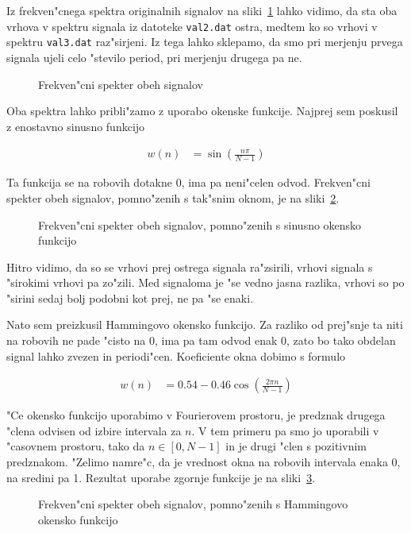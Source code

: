 \documentclass[a4paper,10pt]{article}
\begin{document}
Iz frekven"cnega spektra originalnih signalov na sliki~\ref{fig:val-fft} lahko vidimo, da sta oba vrhova v spektru signala iz datoteke \texttt{val2.dat} ostra, medtem ko so vrhovi v spektru \texttt{val3.dat} raz"sirjeni. Iz tega lahko sklepamo, da smo pri merjenju prvega signala ujeli celo "stevilo period, pri merjenju drugega pa ne. 

\begin{figure}[h]
 
\caption{Frekven"cni spekter obeh signalov}
\label{fig:val-fft}
\end{figure}

Oba spektra lahko pribli"zamo z uporabo okenske funkcije. Najprej sem poskusil z enostavno sinusno funkcijo

\begin{align}
 w(n) &= \sin(\frac{n\pi}{N-1})
\end{align}

Ta funkcija se na robovih dotakne 0, ima pa neni"celen odvod. Frekven"cni spekter obeh signalov, pomno"zenih s tak"snim oknom, je na sliki~\ref{fig:val-cos}. 

\begin{figure}[h]
 
\caption{Frekven"cni spekter obeh signalov, pomno"zenih s sinusno okensko funkcijo}
\label{fig:val-cos}
\end{figure}

Hitro vidimo, da so se vrhovi prej ostrega signala ra"zsirili, vrhovi signala s "sirokimi vrhovi pa zo"zili. Med signaloma je "se vedno jasna razlika, vrhovi so po "sirini sedaj bolj podobni kot prej, ne pa "se enaki. 

Nato sem preizkusil Hammingovo okensko funkcijo. Za razliko od prej"snje ta niti na robovih ne pade "cisto na 0, ima pa tam odvod enak 0, zato bo tako obdelan signal lahko zvezen in periodi"cen. Koeficiente okna dobimo s formulo

\begin{align}
 w(n) &= 0.54 - 0.46 \cos \left(\frac{2\pi n}{N-1}\right)
\end{align}

"Ce okensko funkcijo uporabimo v Fourierovem prostoru, je predznak drugega "clena odvisen od izbire intervala za $n$. V tem primeru pa smo jo uporabili v "casovnem prostoru, tako da $n \in [0,N-1]$ in je drugi "clen s pozitivnim predznakom. "Zelimo namre"c, da je vrednost okna na robovih intervala enaka 0, na sredini pa 1.  Rezultat uporabe zgornje funkcije je na sliki~\ref{fig:val-hamm}. 

\begin{figure}[h]
 
\caption{Frekven"cni spekter obeh signalov, pomno"zenih s Hammingovo okensko funkcijo}
\label{fig:val-hamm}
\end{figure}
\end{document}
